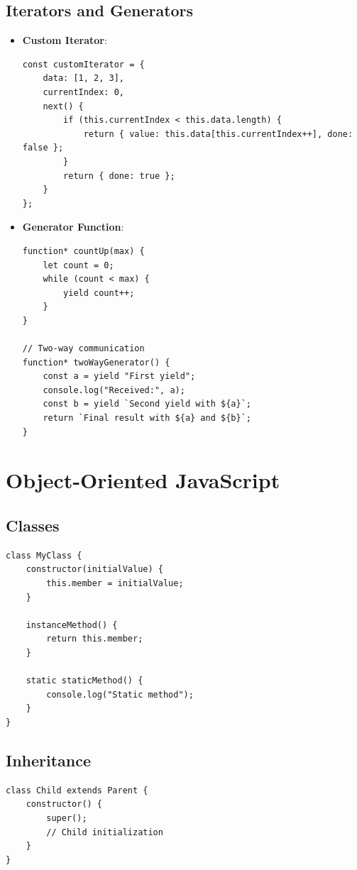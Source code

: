 \documentclass{article}
\begin{document}
\subsection{Iterators and Generators}
\begin{itemize}
    \item \textbf{Custom Iterator}:
    \begin{lstlisting}
const customIterator = {
    data: [1, 2, 3],
    currentIndex: 0,
    next() {
        if (this.currentIndex < this.data.length) {
            return { value: this.data[this.currentIndex++], done: false };
        }
        return { done: true };
    }
};
    \end{lstlisting}
    
    \item \textbf{Generator Function}:
    \begin{lstlisting}
function* countUp(max) {
    let count = 0;
    while (count < max) {
        yield count++;
    }
}

// Two-way communication
function* twoWayGenerator() {
    const a = yield "First yield";
    console.log("Received:", a);
    const b = yield `Second yield with ${a}`;
    return `Final result with ${a} and ${b}`;
}
    \end{lstlisting}
\end{itemize}

\section{Object-Oriented JavaScript}

\subsection{Classes}
\begin{lstlisting}
class MyClass {
    constructor(initialValue) {
        this.member = initialValue;
    }
    
    instanceMethod() {
        return this.member;
    }
    
    static staticMethod() {
        console.log("Static method");
    }
}
\end{lstlisting}

\subsection{Inheritance}
\begin{lstlisting}
class Child extends Parent {
    constructor() {
        super();
        // Child initialization
    }
}
\end{lstlisting}
\end{document}
